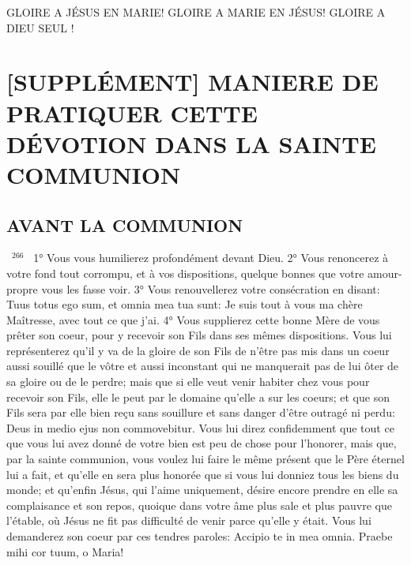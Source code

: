 \documentclass[paper=a5,pagesize=pdftex,fontsize=15pt,headinclude=on,twoside=off]{scrbook}
\newcommand{\negphantom}[1]{\settowidth{\dimen0}{#1}\hspace*{-\dimen0}}
\newcommand{\versenb}[1]{\par \vspace{10pt}~\negphantom{~${}^{#1}$~}${}^{#1}$~}
\begin{document}
GLOIRE A JÉSUS EN MARIE!
GLOIRE A MARIE EN JÉSUS!
GLOIRE A DIEU SEUL !

\section{[SUPPLÉMENT] MANIERE DE PRATIQUER CETTE DÉVOTION DANS LA SAINTE COMMUNION}
\subsection{AVANT LA COMMUNION}
\versenb{266} 1° Vous vous humilierez profondément devant Dieu. 2° Vous renoncerez à votre fond tout corrompu, et à vos
dispositions, quelque bonnes que votre amour-propre vous les fasse voir. 3° Vous renouvellerez votre
consécration en disant: Tuus totus ego sum, et omnia mea tua sunt: Je suis tout à vous ma chère Maîtresse, avec
tout ce que j'ai. 4° Vous supplierez cette bonne Mère de vous prêter son coeur, pour y recevoir son Fils dans ses
mêmes dispositions. Vous lui représenterez qu'il y va de la gloire de son Fils de n'être pas mis dans un coeur aussi
souillé que le vôtre et aussi inconstant qui ne manquerait pas de lui ôter de sa gloire ou de le perdre; mais que si
elle veut venir habiter chez vous pour recevoir son Fils, elle le peut par le domaine qu'elle a sur les coeurs; et que
son Fils sera par elle bien reçu sans souillure et sans danger d'être outragé ni perdu: Deus in medio ejus non
commovebitur. Vous lui direz confidemment que tout ce que vous lui avez donné de votre bien est peu de chose
pour l'honorer, mais que, par la sainte communion, vous voulez lui faire le même présent que le Père éternel lui a
fait, et qu'elle en sera plus honorée que si vous lui donniez tous les biens du monde; et qu'enfin Jésus, qui l'aime
uniquement, désire encore prendre en elle sa complaisance et son repos, quoique dans votre âme plus sale et
plus pauvre que l'étable, où Jésus ne fit pas difficulté de venir parce qu'elle y était. Vous lui demanderez son coeur
par ces tendres paroles: Accipio te in mea omnia. Praebe mihi cor tuum, o Maria!
\end{document}
